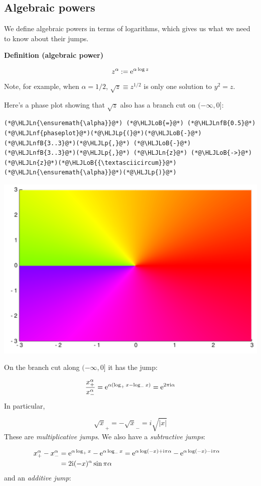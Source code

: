 \documentclass[12pt,a4paper]{article}
\newcommand{\HLJLn}[1]{#1}
\newcommand{\HLJLnf}[1]{\textcolor[RGB]{66,102,213}{#1}}
\newcommand{\HLJLnfB}[1]{\textcolor[RGB]{59,151,46}{#1}}
\newcommand{\HLJLoB}[1]{\textcolor[RGB]{102,102,102}{\textbf{#1}}}
\newcommand{\HLJLp}[1]{#1}
\def\I{ {\rm i} }
\def\E{ {\rm e} }
\begin{document}
\subsection{Algebraic powers}
We define algebraic powers in terms of logarithms, which gives us what we need to know about their jumps. 

\textbf{Definition (algebraic power)} 

\[
z^\alpha := \E^{\alpha \log z}
\]
Note, for example, when $\alpha = 1/2$, $\sqrt z \equiv z^{1/2}$ is only one solution to $y^2 = z$.

Here's a phase plot showing that $\sqrt{z}$ also has a branch cut on $(-\infty,0]$:


\begin{lstlisting}
(*@\HLJLn{\ensuremath{\alpha}}@*) (*@\HLJLoB{=}@*) (*@\HLJLnfB{0.5}@*)
(*@\HLJLnf{phaseplot}@*)(*@\HLJLp{(}@*)(*@\HLJLoB{-}@*)(*@\HLJLnfB{3..3}@*)(*@\HLJLp{,}@*) (*@\HLJLoB{-}@*)(*@\HLJLnfB{3..3}@*)(*@\HLJLp{,}@*) (*@\HLJLn{z}@*) (*@\HLJLoB{->}@*) (*@\HLJLn{z}@*)(*@\HLJLoB{{\textasciicircum}}@*)(*@\HLJLn{\ensuremath{\alpha}}@*)(*@\HLJLp{)}@*)
\end{lstlisting}

\includegraphics[width=\linewidth]{figures/Lecture10_7_1.pdf}

On the branch cut  along $(-\infty,0]$ it has the jump:

\[
{x_+^\alpha \over x_-^\alpha} = \E^{\alpha (\log_+ x - \log_- x)} = \E^{2 \pi \I \alpha}
\]
In particular,

\[
\sqrt{x}_+ = -\sqrt{x}_- = i \sqrt{|x|}
\]
These are \emph{multiplicative jumps}. We also have a \emph{subtractive jumps}:


\begin{align*}
x_+^\alpha - x_-^\alpha &= \E^{\alpha \log_+ x} - \E^{\alpha \log_- x} = \E^{\alpha \log(-x) + \I  \pi \alpha} - \E^{\alpha \log(-x) - \I \pi \alpha} \cr
    & = 2 \I (-x)^\alpha \sin \pi \alpha
\end{align*}
and an \emph{additive jump}:
\end{document}

